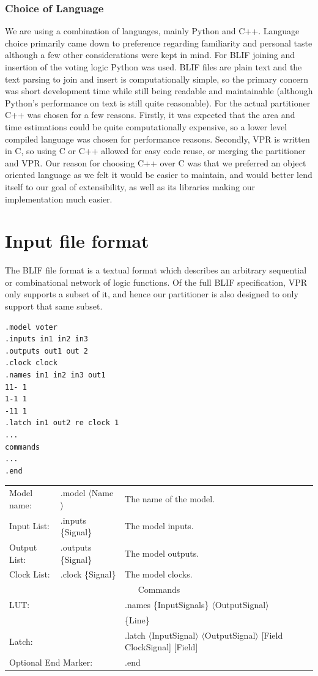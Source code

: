 \documentclass[12pt,final,oneside]{dwThesis} %
\begin{document}
\subsubsection{Choice of Language}
We are using a combination of languages, mainly Python and C++. Language choice primarily came down to preference regarding familiarity and personal taste although a few other considerations were kept in mind.
For \ac{BLIF} joining and insertion of the voting logic Python was used. \ac{BLIF} files are plain text and the text parsing to join and insert is computationally simple, so the primary concern was short development time while still being readable and maintainable (although Python's performance on text is still quite reasonable)\cite{LanguageBenchmark}.
For the actual partitioner C++ was chosen for a few reasons. Firstly, it was expected that the area and time estimations could be quite computationally expensive, so a lower level compiled language was chosen for performance reasons\cite{LanguageBenchmark}. Secondly, \ac{VPR} is written in C, so using C or C++ allowed for easy code reuse, or merging the partitioner and \ac{VPR}. Our reason for choosing C++ over C was that we preferred an object oriented language as we felt it would be easier to maintain, and would better lend itself to our goal of extensibility, as well as its libraries making our implementation much easier.

\section{Input file format}\label{BLIFSection}
The \ac{BLIF} file format is a textual format which describes an arbitrary sequential or combinational network of logic functions\cite{BLIF}.
Of the full \ac{BLIF} specification, \ac{VPR} only supports a subset of it, and hence our partitioner is also designed to only support that same subset.
\begin{lstlisting}[caption=BLIF file layout, label=SampleBlif]
.model voter
.inputs in1 in2 in3
.outputs out1 out 2
.clock clock
.names in1 in2 in3 out1
11- 1
1-1 1
-11 1
.latch in1 out2 re clock 1
...
commands
...
.end
\end{lstlisting}


\begin{tabular}{lll}
    Model name: & .model $\langle$Name$\rangle$ & The name of the model.\\
    Input List: & .inputs \{Signal\} & The model inputs.\\
    Output List:& .outputs \{Signal\} & The model outputs.\\
    Clock List: & .clock \{Signal\} & The model clocks.\\
    \multicolumn{3}{c}{Commands}\\
    \multicolumn{2}{l}{\ac{LUT}:} & .names \{InputSignals\} $\langle$OutputSignal$\rangle$\\
     &&\{Line\}\\
    \multicolumn{2}{l}{Latch:} & .latch $\langle$InputSignal$\rangle$ $\langle$OutputSignal$\rangle$ [Field ClockSignal] [Field]\\
    \multicolumn{2}{l}{Optional End Marker:} & .end
\end{tabular}
\end{document}
